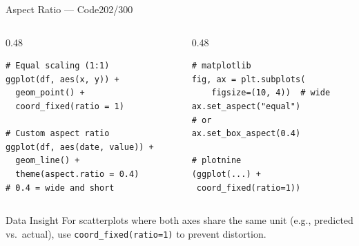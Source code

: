 \documentclass[10pt]{beamer}
\newcommand{\smark}[1]{\hfill{\scriptsize\color{codegray}#1}}
\begin{document}
\begin{frame}[fragile]{Aspect Ratio --- Code}\smark{202/300}
\begin{columns}[T]
\begin{column}{0.48\textwidth}
\begin{lstlisting}[style=Rstyle]
# Equal scaling (1:1)
ggplot(df, aes(x, y)) +
  geom_point() +
  coord_fixed(ratio = 1)

# Custom aspect ratio
ggplot(df, aes(date, value)) +
  geom_line() +
  theme(aspect.ratio = 0.4)
# 0.4 = wide and short
\end{lstlisting}
\end{column}
\begin{column}{0.48\textwidth}
\begin{lstlisting}[style=Pystyle]
# matplotlib
fig, ax = plt.subplots(
    figsize=(10, 4))  # wide
ax.set_aspect("equal")
# or
ax.set_box_aspect(0.4)

# plotnine
(ggplot(...) +
 coord_fixed(ratio=1))
\end{lstlisting}
\end{column}
\end{columns}
\vspace{0.2cm}
\begin{exampleblock}{Data Insight}
    \scriptsize For scatterplots where both axes share the same unit (e.g., predicted vs.\ actual), use \texttt{coord\_fixed(ratio=1)} to prevent distortion.
\end{exampleblock}
\end{frame}
\end{document}
